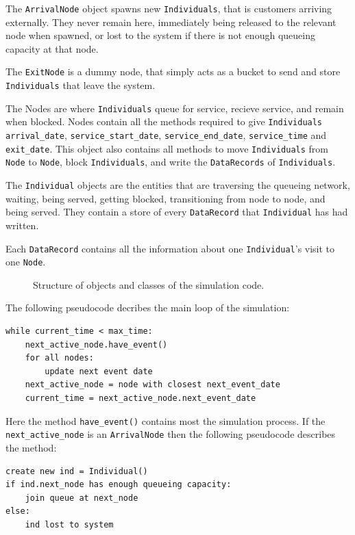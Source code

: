 \documentclass{article}
\begin{document}
The \texttt{ArrivalNode} object spawns new \texttt{Individuals}, that is customers arriving externally.
They never remain here, immediately being released to the relevant node when spawned, or lost to the system if there is not enough queueing capacity at that node.

The \texttt{ExitNode} is a dummy node, that simply acts as a bucket to send and store \texttt{Individuals} that leave the system.

The Nodes are where \texttt{Individuals} queue for service, recieve service, and remain when blocked.
Nodes contain all the methods required to give \texttt{Individuals} \texttt{arrival\_date}, \texttt{service\_start\_date}, \texttt{service\_end\_date}, \texttt{service\_time} and \texttt{exit\_date}.
This object also contains all methods to move \texttt{Individuals} from \texttt{Node} to \texttt{Node}, block \texttt{Individuals}, and write the \texttt{DataRecords} of \texttt{Individuals}.

The \texttt{Individual} objects are the entities that are traversing the queueing network, waiting, being served, getting blocked, transitioning from node to node, and being served.
They contain a store of every \texttt{DataRecord} that \texttt{Individual} has had written.

Each \texttt{DataRecord} contains all the information about one \texttt{Individual}'s visit to one \texttt{Node}.


\begin{figure}[H]
    
    \caption{Structure of objects and classes of the simulation code.}
    \label{fig:codestructure}
\end{figure}

The following pseudocode decribes the main loop of the simulation:

\begin{lstlisting}
while current_time < max_time:
    next_active_node.have_event()
    for all nodes:
        update next event date
    next_active_node = node with closest next_event_date
    current_time = next_active_node.next_event_date
\end{lstlisting}

Here the method \texttt{have\_event()} contains most the simulation process.
If the \texttt{next\_active\_node} is an \texttt{ArrivalNode} then the following pseudocode describes the method:

\begin{lstlisting}
create new ind = Individual()
if ind.next_node has enough queueing capacity:
    join queue at next_node
else:
    ind lost to system
\end{lstlisting}
\end{document}
